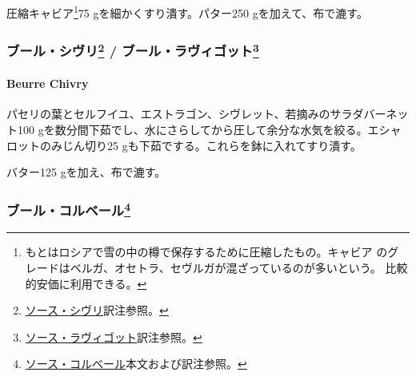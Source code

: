 \begin{recette}
圧縮キャビア\footnote{もとはロシアで雪の中の樽で保存するために圧縮したもの。キャビア
  のグレードはベルガ、オセトラ、セヴルガが混ざっているのが多いという。
  比較的安価に利用できる。}75 gを細かくすり潰す。パター250
gを加えて、布で漉す。

\maeaki

\hypertarget{ux30d6ux30fcux30ebux30b7ux30f4ux30ea12-ux30d6ux30fcux30ebux30e9ux30f4ux30a3ux30b4ux30c3ux30c813}{%
\subsubsection[ブール・シヴリ /
ブール・ラヴィゴット]{\texorpdfstring{ブール・シヴリ\footnote{\protect\hyperlink{sacue-chivry}{ソース・シヴリ}訳注参照。}
/ ブール・ラヴィゴット\footnote{\protect\hyperlink{sauce-ravigote}{ソース・ラヴィゴット}訳注参照。}}{ブール・シヴリ / ブール・ラヴィゴット}}\label{ux30d6ux30fcux30ebux30b7ux30f4ux30ea12-ux30d6ux30fcux30ebux30e9ux30f4ux30a3ux30b4ux30c3ux30c813}}

\hypertarget{beurre-chivry}{%
\paragraph{Beurre Chivry}\label{beurre-chivry}}


パセリの葉とセルフイユ、エストラゴン、シヴレット、若摘みのサラダバーネッ
ト100 gを数分間下茹でし、水にさらしてから圧して余分な水気を絞る。エシャ
ロットのみじん切り25 gも下茹でする。これらを鉢に入れてすり潰す。

バター125 gを加え、布で漉す。

\maeaki

\hypertarget{ux30d6ux30fcux30ebux30b3ux30ebux30d9ux30fcux30eb14}{%
\subsubsection[ブール・コルベール]{\texorpdfstring{ブール・コルベール\footnote{\protect\hyperlink{sauce-colbert}{ソース・コルベール}本文および訳注参照。}}{ブール・コルベール}}\label{ux30d6ux30fcux30ebux30b3ux30ebux30d9ux30fcux30eb14}}


\end{recette}
